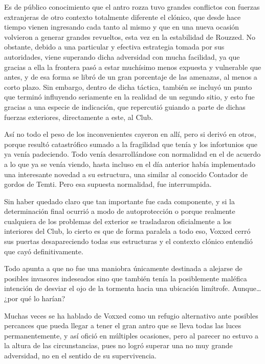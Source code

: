 \documentclass[
]{book}
\begin{document}
Es de público conocimiento que el antro rozza tuvo grandes conflictos con fuerzas extranjeras de otro contexto totalmente diferente el clónico, que desde hace tiempo vienen ingresando cada tanto al mismo y que en una nueva ocasión volvieron a generar grandes revueltos, esta vez en la estabilidad de Rouzzed. No obstante, debido a una particular y efectiva estrategia tomada por sus autoridades, viene superando dicha adversidad con mucha facilidad, ya que gracias a ella la frontera pasó a estar muchísimo menos expuesta y vulnerable que antes, y de esa forma se libró de un gran porcentaje de las amenazas, al menos a corto plazo. Sin embargo, dentro de dicha táctica, también se incluyó un punto que terminó influyendo seriamente en la realidad de un segundo sitio, y esto fue gracias a una especie de indicación, que repercutió guiando a parte de dichas fuerzas exteriores, directamente a este, al Club.

Así no todo el peso de los inconvenientes cayeron en allí, pero si derivó en otros, porque resultó catastrófico sumado a la fragilidad que tenía y los infortunios que ya venía padeciendo. Todo venía desarrollándose con normalidad en el de acuerdo a lo que ya se venía viendo, hasta incluso en el día anterior había implementado una interesante novedad a su estructura, una similar al conocido Contador de gordos de Temti. Pero esa supuesta normalidad, fue interrumpida.

Sin haber quedado claro que tan importante fue cada componente, y si la determinación final ocurrió a modo de autoprotección o porque realmente cualquiera de los problemas del exterior se trasladaron oficialmente a los interiores del Club, lo cierto es que de forma paralela a todo eso, Voxxed cerró sus puertas desapareciendo todas sus estructuras y el contexto clónico entendió que cayó definitivamente.

Todo apunta a que no fue una maniobra únicamente destinada a alejarse de posibles invasores indeseados sino que también tenía la posiblemente maléfica intención de desviar el ojo de la tormenta hacia una ubicación limítrofe. Aunque\ldots{} ¿por qué lo harían?

Muchas veces se ha hablado de Voxxed como un refugio alternativo ante posibles percances que pueda llegar a tener el gran antro que se lleva todas las luces permanentemente, y así ofició en múltiples ocasiones, pero al parecer no estuvo a la altura de las circunstancias, pues no logró superar una no muy grande adversidad, no en el sentido de su supervivencia.
\end{document}

